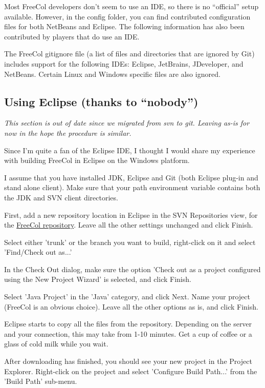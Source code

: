 \documentclass[12pt]{book}
\begin{document}
Most FreeCol developers don't seem to use an IDE, so there is no
``official'' setup available. However, in the config folder, you can
find contributed configuration files for both NetBeans and Eclipse.
The following information has also been contributed by players that do
use an IDE.

The FreeCol gitignore file (a list of files and directories that are
ignored by Git) includes support for the following IDEs: Eclipse,
JetBrains, JDeveloper, and NetBeans. Certain Linux and Windows specific
files are also ignored.

\hypertarget{Using Eclipse}{\subsection{Using Eclipse (thanks to ``nobody'')}}

\emph{This section is out of date since we migrated from svn to git.
Leaving as-is for now in the hope the procedure is similar.}

Since I'm quite a fan of the Eclipse IDE, I thought I would share my
experience with building FreeCol in Eclipse on the Windows platform.

I assume that you have installed JDK, Eclipse and Git (both Eclipse
plug-in and stand alone client). Make sure that your path environment
variable contains both the JDK and SVN client directories.

First, add a new repository location in Eclipse in the SVN
Repositories view, for the
\href{https://svn.freecol.org/svnroot/freecol/freecol/}{FreeCol
  repository}. Leave all the other settings unchanged and click
Finish.

Select either 'trunk' or the branch you want to build, right-click on
it and select 'Find/Check out as...'

In the Check Out dialog, make sure the option 'Check out as a project
configured using the New Project Wizard' is selected, and click
Finish.

Select 'Java Project' in the 'Java' category, and click Next. Name
your project (FreeCol is an obvious choice). Leave all the other
options as is, and click Finish.

Eclipse starts to copy all the files from the repository. Depending on
the server and your connection, this may take from 1-10 minutes. Get a
cup of coffee or a glass of cold milk while you wait.

After downloading has finished, you should see your new project in the
Project Explorer. Right-click on the project and select 'Configure
Build Path...' from the 'Build Path' sub-menu.
\end{document}
